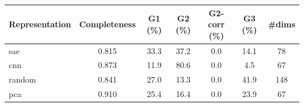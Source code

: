 \begin{tabular}{lcccccc}
\toprule
Representation & Completeness & G1 (\%) & G2 (\%) & G2-corr (\%) & G3 (\%) & \#dims \\
\midrule
sae & 0.815 & 33.3 & 37.2 & 0.0 & 14.1 & 78 \\
cnn & 0.873 & 11.9 & 80.6 & 0.0 & 4.5 & 67 \\
random & 0.841 & 27.0 & 13.3 & 0.0 & 41.9 & 148 \\
pca & 0.910 & 25.4 & 16.4 & 0.0 & 23.9 & 67 \\
\bottomrule
\end{tabular}